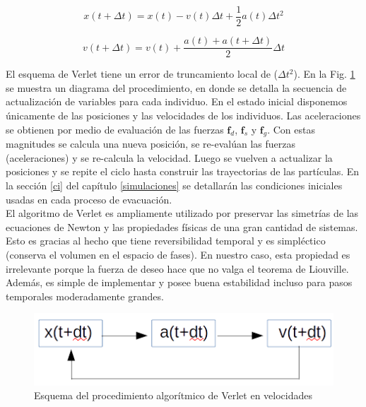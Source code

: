 \begin{equation}
x(t+\Delta t)=x(t)-v(t)\Delta t + \frac{1}{2}a(t)\Delta t^2 
\label{verlet_x}
\end{equation} 

\begin{equation}
v(t+\Delta t)=v(t)+\frac{a(t)+a(t+\Delta t)}{2}\Delta t
\label{verlet_v}
\end{equation}

El esquema de Verlet tiene un error de truncamiento local de ($\Delta t^2$). En la Fig. \ref{esquema_verlet} se muestra un diagrama del procedimiento, en donde se detalla la secuencia de actualización de variables para cada individuo. En el estado inicial disponemos únicamente de las posiciones y las velocidades de los individuos. Las aceleraciones se obtienen por medio de evaluación de las fuerzas $\mathbf{f}_d$, $\mathbf{f}_s$ y $\mathbf{f}_g$. Con estas magnitudes 
se calcula una nueva posición, se re-evalúan las fuerzas (aceleraciones) y se re-calcula la velocidad. Luego se vuelven a actualizar la posiciones y se repite el ciclo hasta construir las trayectorias de las partículas.
En la sección \ref{ci} del capítulo \ref{simulaciones} se detallarán las condiciones iniciales usadas en cada proceso de evacuación.\\

El algoritmo de Verlet es ampliamente utilizado por preservar las simetrías de las ecuaciones de Newton y las propiedades físicas de una gran cantidad de sistemas. Esto es gracias al hecho que tiene reversibilidad temporal y es simpléctico (conserva el volumen en el espacio de fases). En nuestro caso, esta propiedad es irrelevante porque la fuerza de deseo hace que no valga el teorema de Liouville. Además, es simple de implementar y posee buena estabilidad incluso para pasos temporales moderadamente grandes.

\begin{figure}[H]
    \centering
        \includegraphics[scale=0.7]{figuras/esquema_verlet.png}
    \caption[width=5cm]{Esquema del procedimiento algorítmico de Verlet en velocidades}
    \label{esquema_verlet}
\end{figure}
